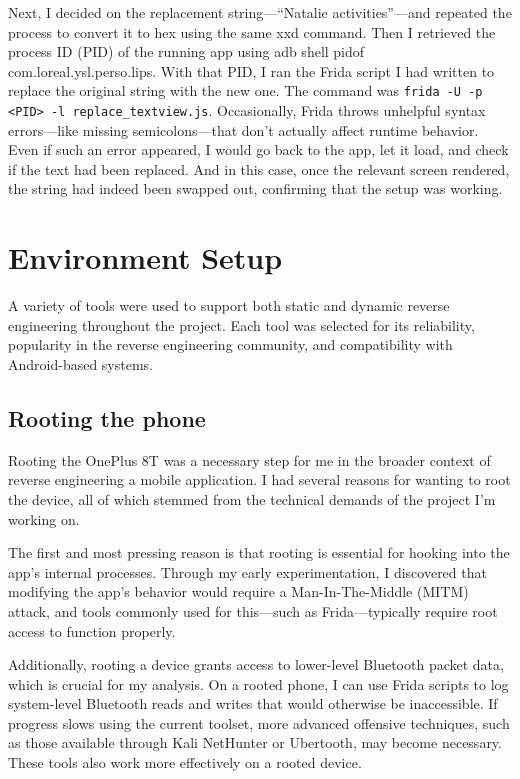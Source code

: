 Next, I decided on the replacement string—“Natalie activities”—and repeated the process to convert it to hex using the same xxd command. Then I retrieved the process ID (PID) of the running app using adb shell pidof com.loreal.ysl.perso.lips. With that PID, I ran the Frida script I had written to replace the original string with the new one. The command was \texttt{frida -U -p <PID> -l replace\_textview.js}. Occasionally, Frida throws unhelpful syntax errors—like missing semicolons—that don’t actually affect runtime behavior. Even if such an error appeared, I would go back to the app, let it load, and check if the text had been replaced. And in this case, once the relevant screen rendered, the string had indeed been swapped out, confirming that the setup was working.



\section{Environment Setup}
A variety of tools were used to support both static and dynamic reverse engineering 
throughout the project. Each tool was selected for its reliability, popularity in the reverse engineering community, and compatibility with Android-based systems.


\subsection{Rooting the phone}
Rooting the OnePlus 8T was a necessary step for me in the broader context of reverse engineering a mobile application. I had several reasons for wanting to root the device, all of which stemmed from the technical demands of the project I’m working on.

The first and most pressing reason is that rooting is essential for hooking into the app's internal processes. Through my early experimentation, I discovered that modifying the app’s behavior would require a Man-In-The-Middle (MITM) attack, and tools commonly used for this—such as Frida—typically require root access to function properly.

Additionally, rooting a device grants access to lower-level Bluetooth packet data, which is crucial for my analysis. On a rooted phone, I can use Frida scripts to log system-level Bluetooth reads and writes that would otherwise be inaccessible. If progress slows using the current toolset, more advanced offensive techniques, such as those available through Kali NetHunter or Ubertooth, may become necessary. These tools also work more effectively on a rooted device.

